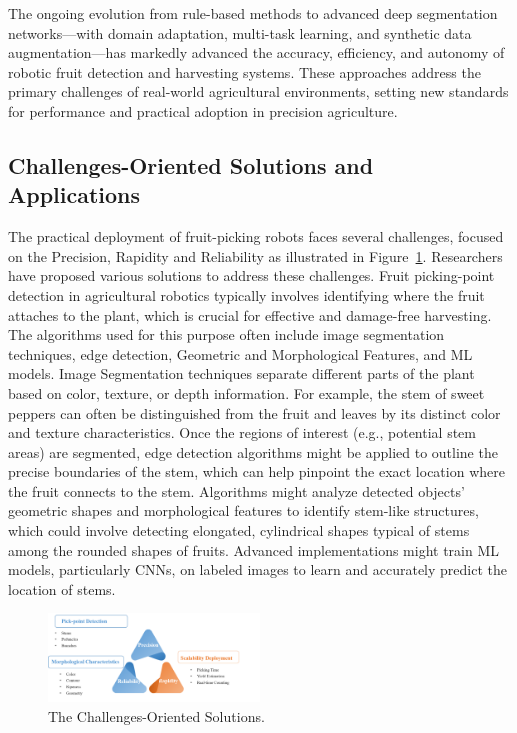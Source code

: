 \documentclass[a4paper,fleqn]{cas-dc}
\begin{document}
The ongoing evolution from rule-based methods to advanced deep segmentation networks—with domain adaptation, multi-task learning, and synthetic data augmentation—has markedly advanced the accuracy, efficiency, and autonomy of robotic fruit detection and harvesting systems. These approaches address the primary challenges of real-world agricultural environments, setting new standards for performance and practical adoption in precision agriculture.

\subsection{Challenges-Oriented Solutions and Applications}
The practical deployment of fruit-picking robots faces several challenges, focused on the Precision, Rapidity and Reliability as illustrated in Figure~\ref{fig:performance}. Researchers have proposed various solutions to address these challenges.
Fruit picking-point detection in agricultural robotics typically involves identifying where the fruit attaches to the plant, which is crucial for effective and damage-free harvesting. The algorithms used for this purpose often include image segmentation techniques, edge detection, Geometric and Morphological Features, and ML models.
Image Segmentation techniques separate different parts of the plant based on color, texture, or depth information. For example, the stem of sweet peppers can often be distinguished from the fruit and leaves by its distinct color and texture characteristics.
Once the regions of interest (e.g., potential stem areas) are segmented, edge detection algorithms might be applied to outline the precise boundaries of the stem, which can help pinpoint the exact location where the fruit connects to the stem.
Algorithms might analyze detected objects' geometric shapes and morphological features to identify stem-like structures, which could involve detecting elongated, cylindrical shapes typical of stems among the rounded shapes of fruits. Advanced implementations might train ML models, particularly CNNs, on labeled images to learn and accurately predict the location of stems.
\begin{figure}[hbtp]
\centering
\includegraphics[width=0.5\textwidth]{fig_performance.png}
\caption{The Challenges-Oriented Solutions.}
\label{fig:performance}
\end{figure}
\end{document}
